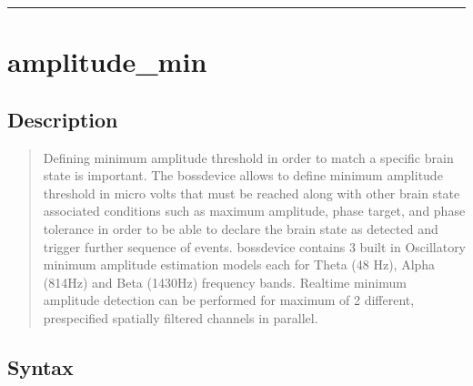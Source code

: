 \documentclass[letterpaper,10pt,english]{sphinxmanual}
\begin{document}
\bigskip\hrule\bigskip



\section{amplitude\_min}
\label{\detokenize{4_api_documentation:amplitude-min}}

\subsection{Description}
\label{\detokenize{4_api_documentation:id29}}\begin{quote}

Defining minimum amplitude threshold in order to match a specific brain state is important. The bossdevice allows to define minimum amplitude threshold in micro volts that must be reached along with other brain state associated conditions such as maximum amplitude, phase target, and phase tolerance in order to be able to declare the brain state as detected and trigger further sequence of events. bossdevice contains 3 built in Oscillatory minimum amplitude estimation models each for Theta (4\sphinxhyphen{}8 Hz), Alpha (8\sphinxhyphen{}14Hz) and Beta (14\sphinxhyphen{}30Hz) frequency bands. Real\sphinxhyphen{}time minimum amplitude detection can be performed for maximum of 2 different, pre\sphinxhyphen{}specified spatially filtered channels in parallel.
\end{quote}


\subsection{Syntax}
\label{\detokenize{4_api_documentation:id30}}
\begin{sphinxVerbatim}[commandchars=\\\{\}]
\PYG{p}{[}\PYG{p}{]} 
\PYG{p}{[}\PYG{p}{]} 
\PYG{p}{[}\PYG{p}{]} 
\end{sphinxVerbatim}
\end{document}
